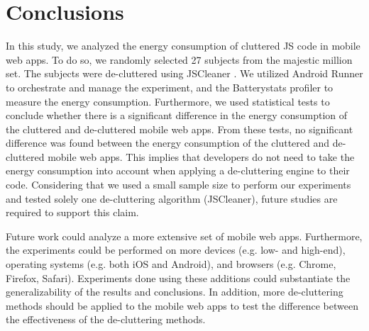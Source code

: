 \section{Conclusions}\label{sec:conclusions}

In this study, we analyzed the energy consumption of cluttered JS code in mobile web apps. To do so, we randomly selected 27 subjects from the majestic million set. The subjects were de-cluttered using JSCleaner \cite{chaqfeh2020jscleaner}. We utilized Android Runner \cite{malavolta2020runner} to orchestrate and manage the experiment, and the Batterystats profiler to measure the energy consumption. Furthermore, we used statistical tests to conclude whether there is a significant difference in the energy consumption of the cluttered and de-cluttered mobile web apps. From these tests, no significant difference was found between the energy consumption of the cluttered and de-cluttered mobile web apps. This implies that developers do not need to take the energy consumption into account when applying a de-cluttering engine to their code. Considering that we used a small sample size to perform our experiments and tested solely one de-cluttering algorithm (JSCleaner), future studies are required to support this claim. %

Future work could analyze a more extensive set of mobile web apps. Furthermore, the experiments could be performed on more devices (e.g. low- and high-end), operating systems (e.g. both iOS and Android), and browsers (e.g. Chrome, Firefox, Safari). Experiments done using these additions could substantiate the generalizability of the results and conclusions. In addition, more de-cluttering methods should be applied to the mobile web apps to test the difference between the effectiveness of the de-cluttering methods.

